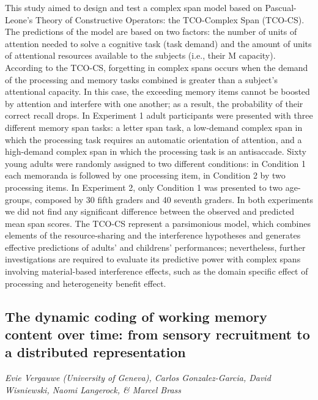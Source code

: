 \documentclass[
  12pt,
]{book}
\begin{document}
This study aimed to design and test a complex span model based on Pascual-Leone's Theory of Constructive Operators: the TCO-Complex Span (TCO-CS). The predictions of the model are based on two factors: the number of units of attention needed to solve a cognitive task (task demand) and the amount of units of attentional resources available to the subjects (i.e., their M capacity). According to the TCO-CS, forgetting in complex spans occurs when the demand of the processing and memory tasks combined is greater than a subject's attentional capacity. In this case, the exceeding memory items cannot be boosted by attention and interfere with one another; as a result, the probability of their correct recall drops. In Experiment 1 adult participants were presented with three different memory span tasks: a letter span task, a low-demand complex span in which the processing task requires an automatic orientation of attention, and a high-demand complex span in which the processing task is an antisaccade. Sixty young adults were randomly assigned to two different conditions: in Condition 1 each memoranda is followed by one processing item, in Condition 2 by two processing items. In Experiment 2, only Condition 1 was presented to two age-groups, composed by 30 fifth graders and 40 seventh graders. In both experiments we did not find any significant difference between the observed and predicted mean span scores. The TCO-CS represent a parsimonious model, which combines elements of the resource-sharing and the interference hypotheses and generates effective predictions of adults' and childrens' performances; nevertheless, further investigations are required to evaluate its predictive power with complex spans involving material-based interference effects, such as the domain specific effect of processing and heterogeneity benefit effect.

\hypertarget{the-dynamic-coding-of-working-memory-content-over-time-from-sensory-recruitment-to-a-distributed-representation}{%
\subsection{The dynamic coding of working memory content over time: from sensory recruitment to a distributed representation}\label{the-dynamic-coding-of-working-memory-content-over-time-from-sensory-recruitment-to-a-distributed-representation}}

\emph{Evie Vergauwe (University of Geneva), Carlos Gonzalez-Garcia, David Wisniewski, Naomi Langerock, \& Marcel Brass}
\end{document}
